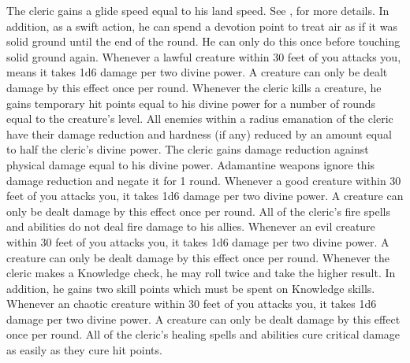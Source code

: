             The cleric gains a glide speed equal to his land speed.
            See , for more details.
            In addition, as a swift action, he can spend a devotion point to treat air as if it was solid ground until the end of the round.
            He can only do this once before touching solid ground again.
            Whenever a lawful creature within 30 feet of you attacks you, means it takes 1d6 damage per two divine power.
            A creature can only be dealt damage by this effect once per round.
            Whenever the cleric kills a creature, he gains temporary hit points equal to his divine power for a number of rounds equal to the creature's level.
            All enemies within a \areamed radius emanation of the cleric have their damage reduction and hardness (if any) reduced by an amount equal to half the cleric's divine power.
            The cleric gains damage reduction against physical damage equal to his divine power.
            Adamantine weapons ignore this damage reduction and negate it for 1 round.
            Whenever a good creature within 30 feet of you attacks you, it takes 1d6 damage per two divine power.
            A creature can only be dealt damage by this effect once per round.
            All of the cleric's fire spells and abilities do not deal fire damage to his allies.
            Whenever an evil creature within 30 feet of you attacks you, it takes 1d6 damage per two divine power.
            A creature can only be dealt damage by this effect once per round.
            Whenever the cleric makes a Knowledge check, he may roll twice and take the higher result.
            In addition, he gains two skill points which must be spent on Knowledge skills.
            Whenever an chaotic creature within 30 feet of you attacks you, it takes 1d6 damage per two divine power.
            A creature can only be dealt damage by this effect once per round.
            All of the cleric's healing spells and abilities cure critical damage as easily as they cure hit points.
